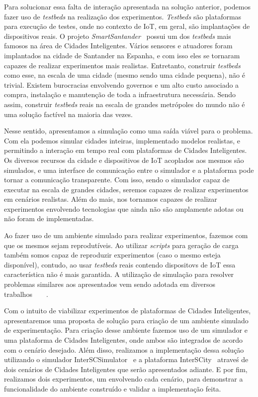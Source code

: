 Para solucionar essa falta de interação apresentada na solução anterior, podemos fazer uso de \textit{testbeds} na realização dos experimentos.
\textit{Testbeds} são plataformas para execução de testes, onde no contexto de IoT, em geral, são implantações de dispositivos reais.
O projeto \textit{SmartSantander}~\cite{sanchez_2014} possui um dos \textit{testbeds} mais famosos na área de Cidades Inteligentes.
Vários sensores e atuadores foram implantados na cidade de Santander na Espanha, e com isso eles se tornaram capazes de realizar experimentos mais realistas.
Entretanto, construir \textit{testbeds} como esse, na escala de uma cidade (mesmo sendo uma cidade pequena), não é trivial.
Existem burocracias envolvendo governos e um alto custo associado a compra, instalação e manutenção de toda a infraestrutura necessária.
Sendo assim, construir \textit{testbeds} reais na escala de grandes metrópoles do mundo não é uma solução factível na maioria das vezes.

Nesse sentido, apresentamos a simulação como uma saída viável para o problema.
Com ela podemos simular cidades inteiras, implementado modelos realistas, e permitindo a interação em tempo real com plataformas de Cidades Inteligentes.
Os diversos recursos da cidade e dispositivos de IoT acoplados aos mesmos são simulados, e uma interface de comunicação entre o simulador e a plataforma pode tornar a comunicação transparente.
Com isso, sendo o simulador capaz de executar na escala de grandes cidades, seremos capazes de realizar experimentos em cenários realistas.
Além do mais, nos tornamos capazes de realizar experimentos envolvendo tecnologias que ainda não são amplamente adotas ou não foram de implementadas.

Ao fazer uso de um ambiente simulado para realizar experimentos, fazemos com que os mesmos sejam reprodutíveis.
Ao utilizar \textit{scripts} para geração de carga também somos capaz de reproduzir experimentos (caso o mesmo esteja disponível), contudo, ao usar \textit{testbeds} reais contendo dispositovs de IoT
essa característica não é mais garantida.
A utilização de simulação para resolver problemas similares aos apresentados vem sendo adotada em diversos trabalhos~\cite{karnouskos_2009}~\cite{fleischer_1994}~\cite{dupuy_1990}~\cite{boukerche_2001}.

Com o intuito de viabilizar experimentos de plataformas de Cidades Inteligentes, apresentaremos uma proposta de solução para criação de um ambiente simulado de experimentação.
Para criação desse ambiente fazemos uso de um simulador e uma plataforma de Cidades Inteligentes, onde ambos são integrados de acordo com o cenário desejado.
Além disso, realizamos a implementação dessa solução utilizando o simulador InterSCSimulator~\cite{santana_17} e a plataforma InterSCity~\cite{arthur_17} atraveś de dois cenários de Cidades Inteligentes
que serão apresentados adiante.
E por fim, realizamos dois experimentos, um envolvendo cada cenário, para demonstrar a funcionalidade do ambiente construído e validar a implementação feita.

